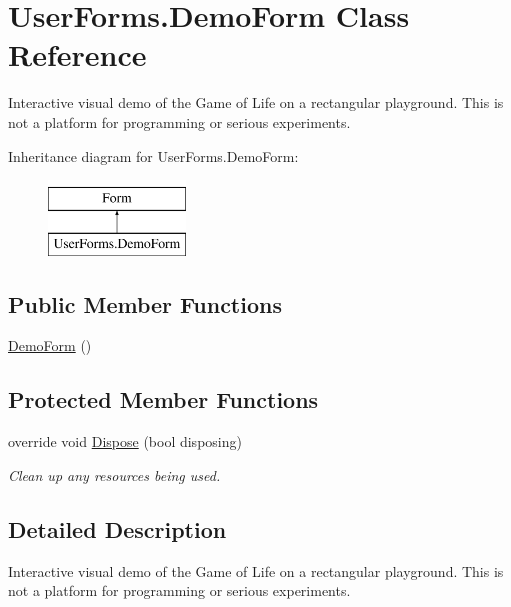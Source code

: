 \hypertarget{class_user_forms_1_1_demo_form}{}\section{User\+Forms.\+Demo\+Form Class Reference}
\label{class_user_forms_1_1_demo_form}


Interactive visual demo of the Game of Life on a rectangular playground. This is not a platform for programming or serious experiments.  


Inheritance diagram for User\+Forms.\+Demo\+Form\+:\begin{figure}[H]
\begin{center}
\leavevmode
\includegraphics[height=2.000000cm]{class_user_forms_1_1_demo_form}
\end{center}
\end{figure}
\subsection*{Public Member Functions}
\begin{DoxyCompactItemize}
\item 
\hyperlink{class_user_forms_1_1_demo_form_a9ef677039850f5ac014ad27d1aa95160}{Demo\+Form} ()
\end{DoxyCompactItemize}
\subsection*{Protected Member Functions}
\begin{DoxyCompactItemize}
\item 
override void \hyperlink{class_user_forms_1_1_demo_form_a1dd0d43c1b10b64a4591d4b6235f0148}{Dispose} (bool disposing)
\begin{DoxyCompactList}\small\item\em Clean up any resources being used. \end{DoxyCompactList}\end{DoxyCompactItemize}


\subsection{Detailed Description}
Interactive visual demo of the Game of Life on a rectangular playground. This is not a platform for programming or serious experiments. 



